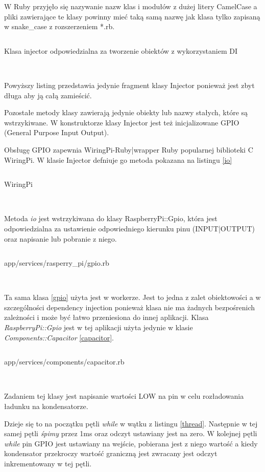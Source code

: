 \documentclass[11pt,a4paper, twoside]{article}
\begin{document}
W Ruby przyjęło się nazywanie nazw klas i modułów z dużej litery \mbox{CamelCase} a pliki zawierające te klasy powinny mieć taką samą nazwę jak klasa tylko zapisaną w snake\_case z rozszerzeniem *.rb.
\begin{listing}[H]
\inputminted[linenos=true]{ruby}{./src/injector.rb}
\caption{Klasa injector odpowiedzialna za tworzenie obiektów z wykorzystaniem DI}
$\label{injector}$
\end{listing}
\noindent
Powyższy listing przedstawia jedynie fragment klasy Injector ponieważ jest zbyt długa aby ją całą zamieścić. 

Pozostałe metody klasy zawierają jedynie obiekty lub nazwy stałych, które są wstrzykiwane. W konstruktorze klasy Injector jest też inicjalizowane GPIO (General Purpose Input Output).

Obsługę GPIO zapewnia WiringPi-Ruby|wrapper Ruby popularnej biblioteki C WiringPi. W klasie Injector defniuje go metoda pokazana na listingu \ref{io}

\begin{listing}[H]
\inputminted[linenos=true]{ruby}{./src/io.rb}
\caption{WiringPi}
$\label{io}$
\end{listing}
\noindent
Metoda \emph{io} jest wstrzykiwana do klasy RaspberryPi::Gpio, która jest odpowiedzialna za ustawienie odpowiedniego kierunku pinu (INPUT|OUTPUT) oraz napisanie lub pobranie z niego.

\begin{listing}[H]
\inputminted[linenos=true]{ruby}{./src/gpio.rb}
\caption{app/services/rasperry\_pi/gpio.rb}
$\label{gpio}$
\end{listing}
\noindent
Ta sama klasa \ref{gpio} użyta jest w workerze. Jest to jedna z zalet obiektowości a w szczególności dependency injection ponieważ klasa nie ma żadnych bezpośrenich zależności i może być łatwo przeniesiona do innej aplikacji. Klasa \emph{RaspberryPi::Gpio} jest w tej aplikacji użyta jedynie w klasie \emph{Components::Capacitor} \ref{capacitor}.
\begin{listing}[H]
\inputminted[linenos=true]{ruby}{./src/capacitor.rb}
\caption{app/services/components/capacitor.rb}
$\label{capacitor}$
\end{listing}
\noindent
Zadaniem tej klasy jest napisanie wartości LOW na pin w celu rozładowania ładunku na kondensatorze. 

 
Dzieje się to na początku pętli \emph{while} w wątku z listingu \ref{thread}. Następnie w tej samej pętli \emph{śpimy} przez 1ms oraz odczyt ustawiany jest na zero. W kolejnej pętli \emph{while} pin GPIO jest ustawiany na wejście, pobierana jest z niego wartość a kiedy kondensator przekroczy wartość graniczną jest zwracany jest odczyt inkrementowany w tej pętli. 
 
\end{document}
